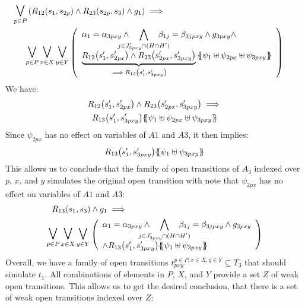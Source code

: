 \documentclass[runningheads]{llncs}
\begin{document}
\begin{enumerate}
\begin{multline*}
\operatorname*{\bigsymb{\bigvee}}_{p\in P} \mpar{R_{12}\mpar{s_1, s_{2p}} \wedge R_{23}\mpar{s_{2p},s_3} \wedge g_1} \implies 
\hspace{5.5cm}\\
\operatorname*{\bigsymb{\bigvee}}_{p\in P}
\operatorname*{\bigsymb{\bigvee}}_{x \in X} 
\operatorname*{\bigsymb{\bigvee}}_{y \in Y}
\mpar{\everymath{\displaystyle}
\begin{array}{l}
\alpha_1=\alpha_{3pxy}\wedge \bigwedge_\subbox{j \in J'_{3pxy} \cap (H\cap H')} \beta_{1j}=\beta_{3jpxy} \wedge g_{3pxy}\wedge \\
\underbrace{R_{12}\mpar{s'_1, s'_{2px}} \wedge R_{23}\mpar{s'_{2px}, s'_{3pxy}}}_{\implies R_{13}\mpar{s'_1,s'_{3pxy}}}\psubst{\psi_1 \uplus \psi_{2px} \uplus \psi_{3pxy}}
\end{array}}
\end{multline*}
We have:
\begin{multline*}
R_{12}{\left(s'_1, s'_{2px}\right)} \wedge R_{23}{\left(s'_{2px}, s'_{3pxy}\right)} \implies\\ R_{13}{\left(s'_1,s'_{3pxy}\right)}
{\left\{\!\!{\left\{\psi_1 \uplus \psi_{2px} \uplus \psi_{3pxy}\right\}}\!\!\right\}}
\end{multline*}
Since $\psi_{2px}$ has no effect on variables of $A1$ and $A3$, it then implies:
\begin{align*}
R_{13}{\left(s'_1,s'_{3pxy}\right)}{\left\{\!\!{\left\{\psi_1  \uplus \psi_{3pxy}\right\}}\!\!\right\}}
\end{align*}
This allows us to conclude that the family of open transitions of $A_3$ indexed over $p$, $x$,  and $y$ simulates the original open transition  with note that $\psi_{2px}$ has no effect on variables of $A1$ and $A3$:
\begin{multline*}
R_{13}(s_1,s_3)  \wedge g_1 \implies 
\hspace{5.5cm}\\
\operatorname*{\bigsymb{\bigvee}}_{p\in P}
\operatorname*{\bigsymb{\bigvee}}_{x \in X} 
\operatorname*{\bigsymb{\bigvee}}_{y \in Y}
\mpar{\everymath{\displaystyle}
\begin{array}{l}
\alpha_1=\alpha_{3pxy}\wedge \bigwedge_\subbox{j \in J'_{3pxy} \cap (H\cap H')} \beta_{1j}=\beta_{3jpxy} \wedge g_{3pxy} \\
{\wedge R_{13}\mpar{s'_1,s'_{3pxy}}}\psubst{\psi_1  \uplus \psi_{3pxy}}
\end{array}}
\end{multline*}
Overall, we have a family of open transitions $t^{p\in P,x\in X,y\in Y}_{pxy} \subseteq T_3$ that should simulate $t_1$. All  combinations of elements in $P$, $X$, and $Y$ provide a set $Z$ of weak open transitions.  This allows us to get the desired conclusion, that there is a set of weak open transitions indexed over $Z$:\\

\end{enumerate}
\end{document}
